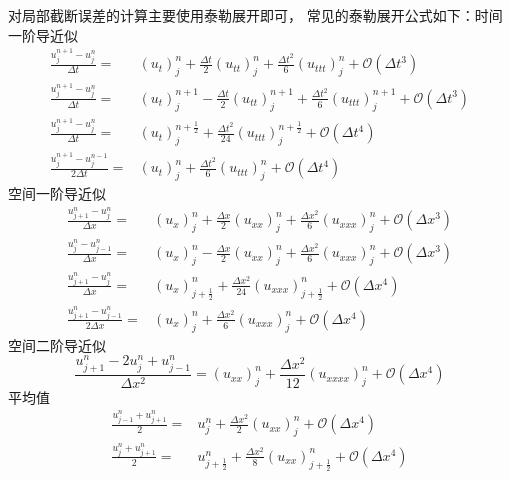 对局部截断误差的计算主要使用泰勒展开即可，
常见的泰勒展开公式如下：时间一阶导近似
\begin{align*}
    \frac{u_j^{n+1}-u_j^n}{\Delta t} ={}      & (u_t)_j^n + \frac{\Delta t}2 (u_{tt})_j^n
    + \frac{\Delta t^2}6 (u_{ttt})_j^n + \mathcal{O}(\Delta t^3)                                                                              \\
    \frac{u_j^{n+1}-u_j^n}{\Delta t} ={}      & (u_t)_j^{n+1} - \frac{\Delta t}2 (u_{tt})_j^{n+1}
    + \frac{\Delta t^2}6 (u_{ttt})_j^{n+1} + \mathcal{O}(\Delta t^3)                                                                          \\
    \frac{u_j^{n+1}-u_j^n}{\Delta t} ={}      & (u_t)_j^{n+\frac12} + \frac{\Delta t^2}{24} (u_{ttt})_j^{n+\frac12} + \mathcal{O}(\Delta t^4) \\
    \frac{u_j^{n+1}-u_j^{n-1}}{2\Delta t} ={} & (u_t)_j^{n} + \frac{\Delta t^2}{6} (u_{ttt})_j^{n} + \mathcal{O}(\Delta t^4)
\end{align*}
空间一阶导近似
\begin{align*}
    \frac{u_{j+1}^{n}-u_j^n}{\Delta x} ={}        & (u_x)_j^n + \frac{\Delta x}2 (u_{xx})_j^n
    + \frac{\Delta x^2}6 (u_{xxx})_j^n + \mathcal{O}(\Delta x^3)                                                                                    \\
    \frac{u_{j}^{n}-u_{j-1}^n}{\Delta x} ={}      & (u_x)_j^{n} - \frac{\Delta x}2 (u_{xx})_j^{n}
    + \frac{\Delta x^2}6 (u_{xxx})_j^{n} + \mathcal{O}(\Delta x^3)                                                                                  \\
    \frac{u_{j+1}^{n}-u_j^n}{\Delta x} ={}        & (u_x)_{j+\frac12}^{n} + \frac{\Delta x^2}{24} (u_{xxx})_{j+\frac12}^n + \mathcal{O}(\Delta x^4) \\
    \frac{u_{j+1}^{n}-u_{j-1}^{n}}{2\Delta x} ={} & (u_x)_j^{n} + \frac{\Delta x^2}{6} (u_{xxx})_j^{n} + \mathcal{O}(\Delta x^4)
\end{align*}
空间二阶导近似
\[
    \frac{u_{j+1}^{n} - 2 u_j^n + u_{j-1}^n}{\Delta x^2} ={}
    (u_{xx})_{j}^n + \frac{\Delta x^2}{12} (u_{xxxx})_j^n + \mathcal{O}(\Delta x^4)
\]
平均值
\begin{align*}
    \frac{u_{j-1}^{n} + u_{j+1}^n}{2} ={} & u_j^n + \frac{\Delta x^2}2 (u_{xx})_j^n + \mathcal{O}(\Delta x^4)                     \\
    \frac{u_{j}^{n} + u_{j+1}^n}{2} ={}   & u_{j+\frac12}^n + \frac{\Delta x^2}8 (u_{xx})_{j+\frac12}^n + \mathcal{O}(\Delta x^4)
\end{align*}

